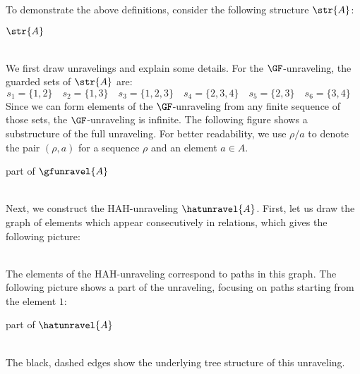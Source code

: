 \begin{example}
  \newlength\figindent\setlength\figindent{7em}%
  \newlength\figdist\setlength\figdist{2em}%
  To demonstrate the above definitions, consider the following structure $\str{A}$:\\[1ex]
  \begin{minipage}{\figindent}
    \raggedleft
    \Huge{$\str{A}$}
  \end{minipage}
  \hspace{\figdist}
  \\

  \noindent
  We first draw unravelings and explain some details.
  For the $\GF$-unraveling, the guarded sets of $\str{A}$ are:
  \begin{equation*}
    s_{1} = \{1,2\}\quad
    s_{2} = \{1,3\}\quad
    s_{3} = \{1,2,3\}\quad
    s_{4} = \{2,3,4\}\quad
    s_{5} = \{2,3\}\quad
    s_{6} = \{3,4\}\quad
  \end{equation*}
  Since we can form elements of the $\GF$-unraveling from any finite sequence of those sets, the $\GF$-unraveling is infinite.
  The following figure shows a substructure of the full unraveling.
  For better readability, we use $\rho / a$ to denote the pair $(\rho, a)$ for a sequence $\rho$ and an element $a \in A$.\\[2ex]
  \begin{minipage}{\figindent}
    \raggedleft
    part of \Huge{$\gfunravel{A}$}
  \end{minipage}
  \hspace{\figdist}
  \\[1ex]

  \noindent
  Next, we construct the HAH-unraveling $\hatunravel{A}$. First, let us draw the graph of elements which appear consecutively in relations, which gives the following picture:\\[1ex]
  \begin{minipage}{\figindent}
    \mbox{}
  \end{minipage}
  \hspace{\figdist}
  \\[1ex]
  The elements of the HAH-unraveling correspond to paths in this graph.
  The following picture shows a part of the unraveling, focusing on paths starting from the element $1$:\\[1ex]
  \begin{minipage}{\figindent}
    \raggedleft
    part of \Huge{$\hatunravel{A}$}
  \end{minipage}
  \hspace{\figdist}
  \\[2ex]
  The black, dashed edges show the underlying tree structure of this unraveling.


\end{example}
